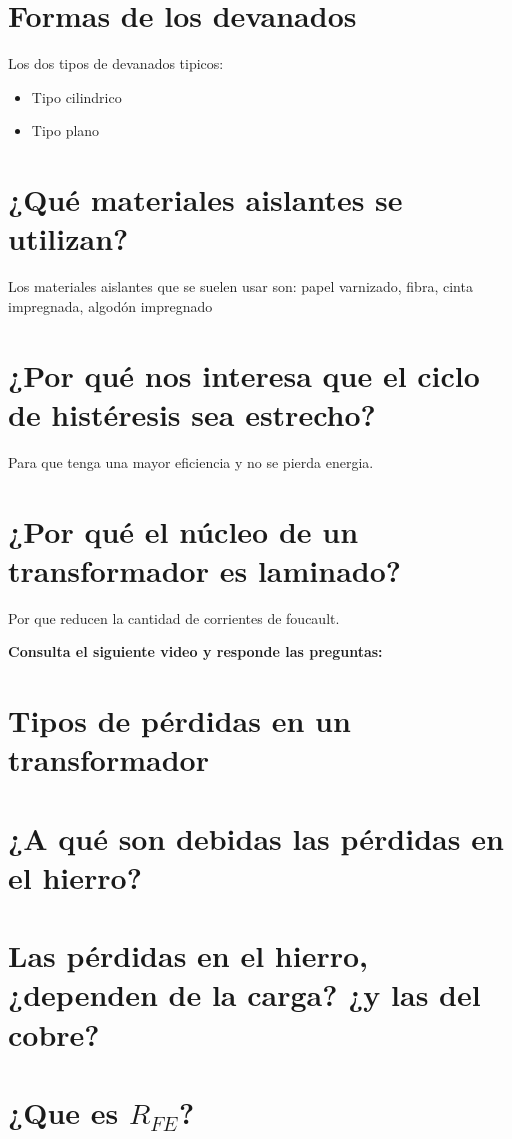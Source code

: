 \documentclass{report}
\begin{document}
\section{Formas de los devanados}
  Los dos tipos de devanados tipicos:
  \begin{itemize}
    \item{} Tipo cilindrico
    \item{} Tipo plano
  \end{itemize}

\section{¿Qué materiales aislantes se utilizan?}
  Los materiales aislantes que se suelen usar son: papel varnizado, fibra, cinta impregnada, algodón impregnado

\section{¿Por qué nos interesa que el ciclo de histéresis sea estrecho?}
  Para que tenga una mayor eficiencia y no se pierda energia.
\section{¿Por qué el núcleo de un transformador es laminado?}
  Por que reducen la cantidad de corrientes de foucault.
\newpage
\begin{huge}
  \textbf{{Consulta el siguiente video y responde las preguntas:}}\label{chapter:2}
\end{huge}
\vspace{1em}
\setcounter{chapter}{2}
\setcounter{section}{0}
\section{Tipos de pérdidas en un transformador}
\section{¿A qué son debidas las pérdidas en el hierro?}
\section{Las pérdidas en el hierro, ¿dependen de la carga? ¿y las del cobre?}
\section{\texorpdfstring{¿Que es \(R_{FE}\)?}{¿Que es R\_FE ?}}
\end{document}
